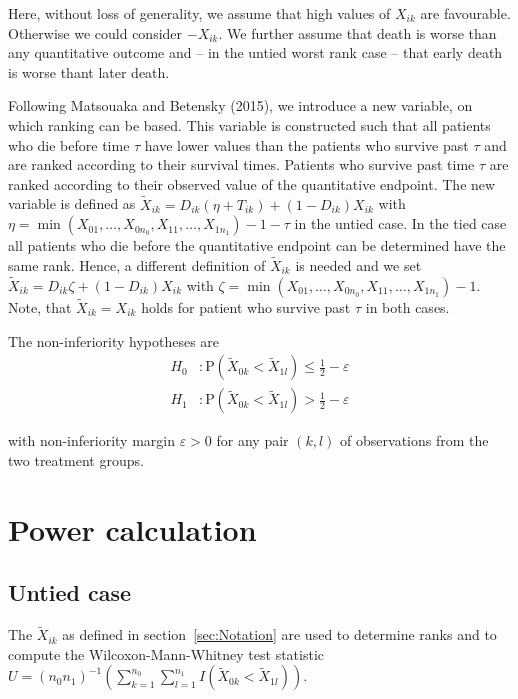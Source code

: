 \documentclass[bimj,fleqn]{w-art}\usepackage[]{graphicx}\usepackage[]{color}
\theoremstyle{plain}
\theoremstyle{definition}
\begin{document}
Here, without loss of generality, we assume that high values of $X_{ik}$ are
favourable. Otherwise we could consider $-X_{ik}$. We further assume that
death is worse than any quantitative outcome and -- in the untied worst rank
case -- that early death is worse thant later death.

Following Matsouaka and Betensky (2015), we introduce a new variable, on which
  ranking can be based. This variable is constructed such that all patients who
  die before time $\tau$ have lower values than the patients who survive past
  $\tau$ and are ranked according to their survival times. Patients who survive
  past time $\tau$ are ranked according to their observed value of the quantitative
  endpoint. The new variable is defined as
  $\widetilde{X}_{ik} = D_{ik}(\eta  + T_{ik}) + (1 - D_{ik})X_{ik}$ with
  $\eta = \min(X_{01}, \ldots, X_{0n_0}, X_{11}, \ldots, X_{1n_1}) - 1 - \tau$
  in the untied case.  In the tied case all patients who die before the quantitative endpoint
  can be determined have the same rank. Hence, a different definition of $\widetilde{X}_{ik}$
  is needed and we set  $\widetilde{X}_{ik} = D_{ik}\zeta   + (1 - D_{ik})X_{ik}$
  with $\zeta = \min(X_{01}, \ldots, X_{0n_0}, X_{11}, \ldots, X_{1n_1}) - 1$.
  Note, that  $\widetilde{X}_{ik} = {X}_{ik}$ holds for patient who survive past $\tau$ in both cases.

  The non-inferiority hypotheses are
\begin{align*}
  H_0 &:  \text{P}(\widetilde{X}_{0k} < \widetilde{X}_{1l})
          \leq \frac{1}{2} - \varepsilon \\
H_1 &:  \text{P}(\widetilde{X}_{0k} < \widetilde{X}_{1l})
          > \frac{1}{2} - \varepsilon
\end{align*}

with non-inferiority margin $\varepsilon > 0$ for any pair $(k, l)$ of
observations from the two treatment groups.

\section{Power calculation}
\label{sec:Power}
\subsection{Untied case}
\label{sec:PowerUntied}
The $\widetilde{X}_{ik}$ as defined in section~\ref{sec:Notation} are used to
  determine ranks and to compute the Wilcoxon-Mann-Whitney test statistic
  $ U =(n_0 n_1)^{-1}(\sum_{k=1}^{n_0}
    \sum_{l=1}^{n_1}I(\widetilde{X}_{0k} < \widetilde{X}_{1l})) $.
\end{document}
